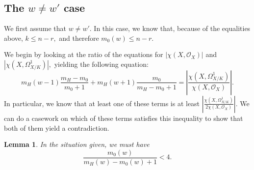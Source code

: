 \documentclass{article}
\newtheorem{lemma}[thm]{Lemma}
\theoremstyle{definition}
\theoremstyle{remark}
\begin{document}
\subsection{The $w \neq w'$ case}
We first assume that $w \neq w'.$ In this case, we know that, because of the equalities above, $k \leq n - r,$ and therefore $m_0(w) \leq n - r.$
\par We begin by looking at the ratio of the equations for $|\chi(X, \mathcal{O}_X)|$ and $|\chi(X, \Omega^1_{X/K})|,$ yielding the following equation: \[m_H(w-1) \frac{m_H - m_0}{m_0 + 1} + m_H(w+1) \frac{m_0}{m_H - m_0 + 1} = \left|\frac{\chi(X, \Omega^1_{X/K})}{\chi(X, \mathcal{O}_X)}\right|.\] In particular, we know that at least one of these terms is at least $\left|\frac{\chi(X, \Omega^1_{X/K})}{2\chi(X, \mathcal{O}_X)}\right|.$ We can do a casework on which of these terms satisfies this inequality to show that both of them yield a contradiction.
\begin{lemma}\label{lem: m0 cannot be too big}
In the situation given, we must have $$\frac{m_0(w)}{m_H(w) - m_0(w) + 1} < 4.$$ 
\end{lemma}
\end{document}
